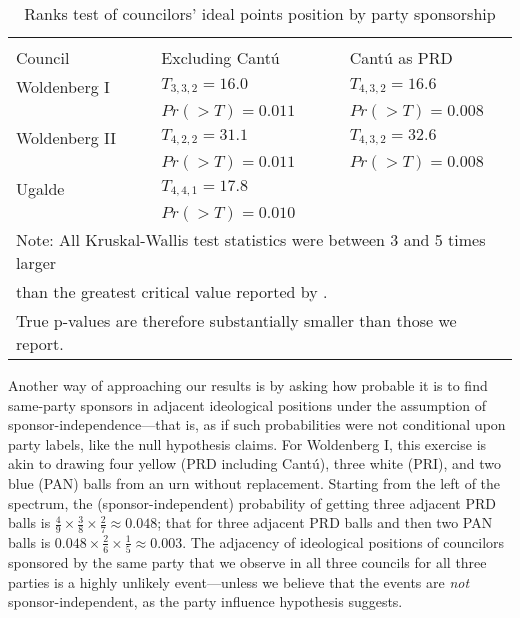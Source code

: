\documentclass[12 pt, letter]{article}
\begin{document}
\begin{table}
\caption{Ranks test of councilors' ideal points position by party
sponsorship}\label{T:kw}
\begin{center}
\begin{tabular}{lclcl}
\hline\\[-1.5ex]
Council       && Excluding Cant\'u  && Cant\'u as PRD     \\  \hline
Woldenberg I  && $T_{3,3,2}=16.0$   && $T_{4,3,2}=16.6$   \\
              && $Pr(>T)=0.011$     && $Pr(>T)=0.008$     \\
Woldenberg II && $T_{4,2,2}=31.1$   && $T_{4,3,2}=32.6$   \\
              && $Pr(>T)=0.011$     && $Pr(>T)=0.008$     \\
Ugalde        && $T_{4,4,1}=17.8$   &&                    \\
              && $Pr(>T)=0.010$     &&                    \\  \hline
\multicolumn{5}{l}{\footnotesize{{\sc Note}: All Kruskal-Wallis test statistics were between 3 and 5 times larger}}\\
\multicolumn{5}{l}{\footnotesize{than the greatest critical value reported by \citet[][Table A.12]{Daniel1990}.}}\\
\multicolumn{5}{l}{\footnotesize{True p-values are therefore substantially smaller than those we report.}}\\
\end{tabular}
\end{center}
\end{table}

Another way of approaching our results is by asking how probable it is to find same-party sponsors in adjacent ideological positions under the assumption of sponsor-independence---that is, as if such probabilities were not conditional upon party labels, like the null hypothesis claims. For Woldenberg I, this exercise is akin to drawing four yellow (PRD including Cant\'u), three white (PRI), and two blue (PAN) balls from an urn without replacement. Starting from the left of the spectrum, the (sponsor-independent) probability of getting three adjacent PRD balls is $\frac{4}{9} \times \frac{3}{8} \times \frac{2}{7} \approx 0.048$; that for three adjacent PRD balls and then two PAN balls is $0.048 \times \frac{2}{6} \times \frac{1}{5} \approx 0.003$.  The adjacency of ideological positions of councilors sponsored by the same party that we observe in all three councils for all three parties is a highly unlikely event---unless we believe that the events are \emph{not} sponsor-independent, as the party influence hypothesis suggests.
\end{document}
